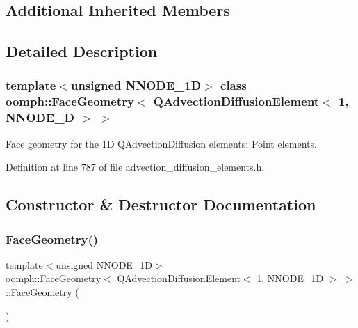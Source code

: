 \subsection*{Additional Inherited Members}


\subsection{Detailed Description}
\subsubsection*{template$<$unsigned N\+N\+O\+D\+E\+\_\+1D$>$\newline
class oomph\+::\+Face\+Geometry$<$ Q\+Advection\+Diffusion\+Element$<$ 1, N\+N\+O\+D\+E\+\_\+D $>$ $>$}

Face geometry for the 1D Q\+Advection\+Diffusion elements\+: Point elements. 

Definition at line 787 of file advection\+\_\+diffusion\+\_\+elements.\+h.



\subsection{Constructor \& Destructor Documentation}
\mbox{\label{classoomph_1_1FaceGeometry_3_01QAdvectionDiffusionElement_3_011_00_01NNODE__1D_01_4_01_4_afae2c6310d40868a8679d1ec82a869fb}} 
\subsubsection{\texorpdfstring{Face\+Geometry()}{FaceGeometry()}}
{\footnotesize\ttfamily template$<$unsigned N\+N\+O\+D\+E\+\_\+1D$>$ \\
\hyperlink{classoomph_1_1FaceGeometry}{oomph\+::\+Face\+Geometry}$<$ \hyperlink{classoomph_1_1QAdvectionDiffusionElement}{Q\+Advection\+Diffusion\+Element}$<$ 1, N\+N\+O\+D\+E\+\_\+1D $>$ $>$\+::\hyperlink{classoomph_1_1FaceGeometry}{Face\+Geometry} (\begin{DoxyParamCaption}{ }\end{DoxyParamCaption})\hspace{0.3cm}{\ttfamily [inline]}}



